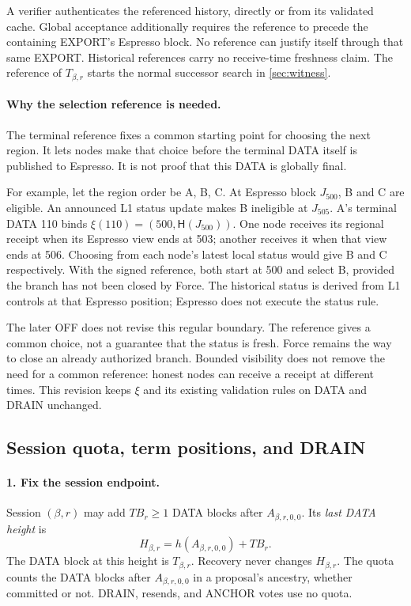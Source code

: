 \documentclass[11pt,a4paper]{article}
\newcommand{\Hash}{\mathsf H}
\newcommand{\TB}{\mathit{TB}}
\newcommand{\defterm}[1]{\textcolor{rrBlue}{\textit{#1}}}
\begin{document}
A verifier authenticates the referenced history, directly or from its
validated cache. Global acceptance additionally requires the reference
to precede the containing EXPORT's Espresso block. No reference can
justify itself through that same EXPORT. Historical references carry no
receive-time freshness claim. The reference of $T_{\beta,r}$ starts the normal
successor search in \cref{sec:witness}.

\paragraph{Why the selection reference is needed.}
The terminal reference fixes a common starting point for choosing the next
region. It lets nodes make that choice before the terminal DATA itself is
published to Espresso. It is not proof that this DATA is globally final.

For example, let the region order be A, B, C. At Espresso block $J_{500}$,
B and C are eligible. An announced L1 status update makes B ineligible at
$J_{505}$. A's terminal DATA 110 binds $\xi(110)=(500,\Hash(J_{500}))$.
One node receives its regional receipt when its Espresso view ends at 503;
another receives it when that view ends at 506. Choosing from each node's
latest local status would give B and C respectively. With the signed
reference, both start at 500 and select B, provided the branch has not
been closed by Force. The historical status is derived from L1 controls
at that Espresso position; Espresso does not execute the status rule.

The later OFF does not revise this regular boundary. The reference gives
a common choice, not a guarantee that the status is fresh. Force remains
the way to close an already authorized branch. Bounded visibility does
not remove the need for a common reference: honest nodes can receive a
receipt at different times. This revision keeps $\xi$ and its existing
validation rules on DATA and DRAIN unchanged.

\subsection{Session quota, term positions, and DRAIN}
\label{sec:quota}
\paragraph{1. Fix the session endpoint.}
Session $(\beta,r)$ may add $\TB_r\ge1$ DATA blocks after $A_{\beta,r,0,0}$. Its \defterm{last
DATA height} is
\[
 H_{\beta,r}=h(A_{\beta,r,0,0})+\TB_r.
\]
The DATA block at this height is $T_{\beta,r}$. Recovery never changes $H_{\beta,r}$.
The quota counts the DATA blocks after $A_{\beta,r,0,0}$ in a proposal's
ancestry, whether committed or not. DRAIN, resends, and ANCHOR votes
use no quota.
\end{document}
